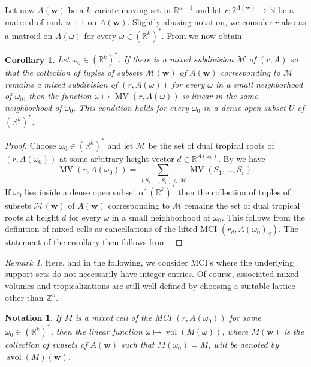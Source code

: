 \documentclass[a4paper]{article}
\newtheorem{corollary}{Corollary}
\newtheorem{notation}{Notation}
\theoremstyle{remark}
\newtheorem{remark}{Remark}
\def\NN{\mathbb{N}}
\def\RR{\mathbb{R}}
\def\ZZ{\mathbb{Z}}
\def\ww{\mathbf{w}}
\DeclareMathOperator{\mv}{MV}
\DeclareMathOperator{\vol}{vol}
\DeclareMathOperator{\svol}{svol}
\begin{document}
Let now $A(\mathbf{w})$ be a $k$-variate moving set in $\RR^{n+1}$ and
let $r : 2^{A(\ww)} \rightarrow \NN$ be a matroid of rank $n + 1$ on
$A(\ww)$. Slightly abusing notation, we consider $r$ also as a matroid
on $A(\omega)$ for every $\omega\in (\RR^k)^{*}$. From  we now
obtain
\begin{corollary}
  \label{prop:mvpiecewise}
  Let $\omega_0\in (\RR^k)^{*}$. If there is a mixed subdivision
  $\mathcal{M}$ of $(r, A)$ so that the collection of tuples of subsets
  $\mathcal{M}(\mathbf{w})$ of $A(\ww)$ corresponding to $\mathcal{M}$ remains a mixed
  subdivision of $(r, A(\omega))$ for every $\omega$ in a small neighborhood of
  $\omega_0$, then the function $\omega \mapsto \mv(r, A(\omega))$ is linear in the same
  neighborhood of $\omega_0$. This condition holds for every
  $\omega_0$ in a dense open subset $U$ of $(\RR^k)^{*}$.
\end{corollary}
\begin{proof}
  Choose $\omega_0 \in (\RR^k)^{*}$ and let $\mathcal{M}$ be the set of dual tropical
  roots of $(r, A(\omega_0))$ at some arbitrary height vector
  $d\in \RR^{A(\omega_0)}$. By  we have
  \[\mv(r, A(\omega_0)) = \sum_{(S_1,\dots,S_r)\in \mathcal{M}} \mv(S_1,\dots,S_r).\]
  If $\omega_0$ lies inside a dense open subset of $(\RR^k)^{*}$ then the
  collection of tuples of subsets $\mathcal{M}(\mathbf{w})$ of
  $A(\ww)$ corresponding to $\mathcal{M}$ remains the set of dual tropical roots
  at height $d$ for every $\omega$ in a small neighborhood of
  $\omega_0$. This follows from the definition of mixed cells as
  cancellations of the lifted MCI $(r_d,A(\omega_0)_d)$. The statement
  of the corollary then follows from .
\end{proof}

\begin{remark}
  Here, and in the following, we consider MCI's where the underlying
  support sets do not necessarily have integer entries. Of course,
  associated mixed volumes and tropicalizations are still well defined
  by choosing a suitable lattice other than $\ZZ^n$.
\end{remark}

\begin{notation}
  If $M$ is a mixed cell of the MCI $(r, A(\omega_0))$ for some
  $\omega_0\in (\RR^k)^{*}$, then the linear function
  $\omega \mapsto \vol(M(\omega))$, where $M(\ww)$ is the collection of subsets of
  $A(\ww)$ such that $M(\omega_0) = M$, will be denoted by $\svol(M)(\ww)$.
\end{notation}
\end{document}
